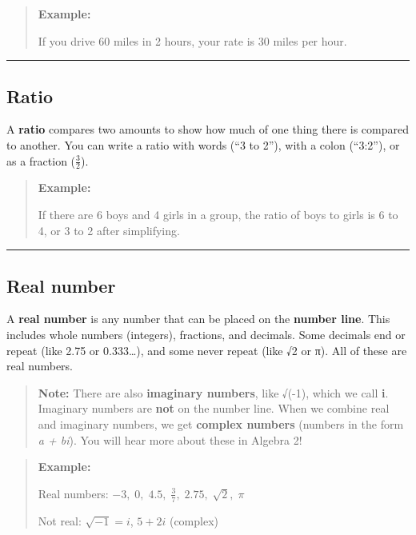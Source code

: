 \documentclass[
  letterpaper,
  DIV=11,
  numbers=noendperiod]{scrreprt}
\begin{document}
\begin{quote}
\textbf{Example:}

If you drive 60 miles in 2 hours, your rate is 30 miles per hour.
\end{quote}

\begin{center}\rule{0.5\linewidth}{0.5pt}\end{center}

\subsection*{Ratio}\label{glossary-ratio}

A \textbf{ratio} compares two amounts to show how much of one thing
there is compared to another. You can write a ratio with words (``3 to
2''), with a colon (``3:2''), or as a fraction (\(\frac{3}{2}\)).

\begin{quote}
\textbf{Example:}

If there are 6 boys and 4 girls in a group, the ratio of boys to girls
is 6 to 4, or 3 to 2 after simplifying.
\end{quote}

\begin{center}\rule{0.5\linewidth}{0.5pt}\end{center}

\subsection*{Real number}\label{glossary-real-number}

A \textbf{real number} is any number that can be placed on the
\textbf{number line}. This includes whole numbers (integers), fractions,
and decimals. Some decimals end or repeat (like 2.75 or 0.333\ldots),
and some never repeat (like √2 or π). All of these are real numbers.

\begin{quote}
\textbf{Note:} There are also \textbf{imaginary numbers}, like √(-1),
which we call \textbf{i}. Imaginary numbers are \textbf{not} on the
number line. When we combine real and imaginary numbers, we get
\textbf{complex numbers} (numbers in the form \emph{a + bi}). You will
hear more about these in Algebra 2!
\end{quote}

\begin{quote}
\textbf{Example:}

Real numbers:
\(-3,\; 0,\; 4.5,\; \frac{3}{7},\; 2.75,\; \sqrt{2},\; \pi\)

Not real: \(\sqrt{-1}=i\), \(5+2i\) (complex)
\end{quote}
\end{document}
